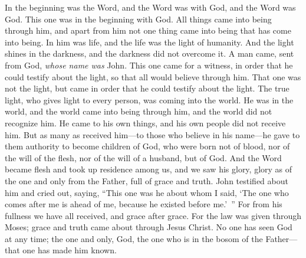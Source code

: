 
\begin{biblechapter} %
 In the beginning was the Word, and the Word was with God, and the Word was God.
\verse This one was in the beginning with God.
\verse All things came into being through him, and apart from him not one thing came into being that has come into being.
\verse In him was life, and the life was the light of humanity.
\verse And the light shines in the darkness, and the darkness did not overcome it.
\verse A man came, sent from God, \textit{whose name was} John.
\verse This one came for a witness, in order that he could testify about the light, so that all would believe through him.
\verse That one was not the light, but came in order that he could testify about the light.
\verse The true light, who gives light to every person, was coming into the world.
\verse He was in the world, and the world came into being through him, and the world did not recognize him.
\verse He came to his own things, and his own people did not receive him.
\verse But as many as received him—to those who believe in his name—he gave to them authority to become children of God,
\verse who were born not of blood, nor of the will of the flesh, nor of the will of a husband, but of God.
\verse And the Word became flesh and took up residence among us, and we saw his glory, glory as of the one and only from the Father, full of grace and truth.
\verse John testified about him and cried out, saying, “This one was he about whom I said, ‘The one who comes after me is ahead of me, because he existed before me.’ ”
\verse For from his fullness we have all received, and grace after grace.
\verse For the law was given through Moses; grace and truth came about through Jesus Christ.
\verse No one has seen God at any time; the one and only, God, the one who is in the bosom of the Father—that one has made him known.

\end{biblechapter}
